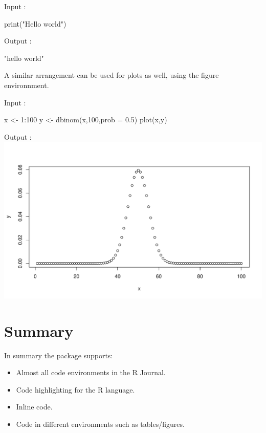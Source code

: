 \begin{Schunk}
Input :
\begin{Sinput}
print("Hello world")
\end{Sinput}
Output :
\begin{Soutput}
[1] "hello world"
\end{Soutput}
\end{Schunk}

A similar arrangement can be used for plots as well, using the figure environnment.

\begin{Schunk}
Input :
\begin{Sinput}
x <- 1:100
y <- dbinom(x,100,prob = 0.5)
plot(x,y)
\end{Sinput}
Output :\\
\includegraphics[width=1\textwidth]{binom}
\end{Schunk}


\section{Summary}

In summary the  package supports:
\begin{itemize}
\item Almost all code environments in the R Journal.
\item Code highlighting for the R language.
\item Inline code.
\item Code in different environments such as tables/figures.
\end{itemize}



